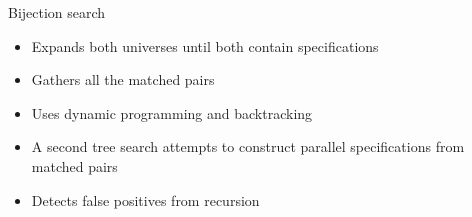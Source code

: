 \begin{frame}{Bijection search}
    \begin{itemize}
        \item Expands both universes until both contain specifications
        \item Gathers all the matched pairs
        \item Uses dynamic programming and backtracking
        \item A second tree search attempts to construct parallel specifications from matched pairs
        \item Detects false positives from recursion
    \end{itemize}
\end{frame}